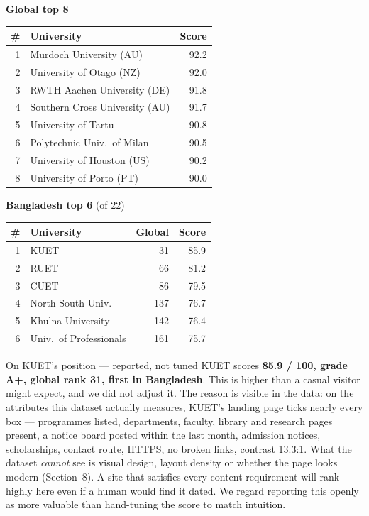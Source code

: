 \documentclass[11pt,a4paper]{article}
\begin{document}
\begin{table}[H]\centering\small
\begin{minipage}[t]{0.52\textwidth}\centering
\textbf{Global top 8}\\[3pt]
\begin{tabular}{rlr}
\toprule
\# & University & Score \\
\midrule
1 & Murdoch University (AU)       & 92.2 \\
2 & University of Otago (NZ)      & 92.0 \\
3 & RWTH Aachen University (DE)   & 91.8 \\
4 & Southern Cross University (AU)& 91.7 \\
5 & University of Tartu           & 90.8 \\
6 & Polytechnic Univ.\ of Milan   & 90.5 \\
7 & University of Houston (US)    & 90.2 \\
8 & University of Porto (PT)      & 90.0 \\
\bottomrule
\end{tabular}
\end{minipage}%
\begin{minipage}[t]{0.48\textwidth}\centering
\textbf{Bangladesh top 6} (of 22)\\[3pt]
\begin{tabular}{rlrr}
\toprule
\# & University & Global & Score \\
\midrule
1 & KUET  & 31  & 85.9 \\
2 & RUET  & 66  & 81.2 \\
3 & CUET  & 86  & 79.5 \\
4 & North South Univ. & 137 & 76.7 \\
5 & Khulna University & 142 & 76.4 \\
6 & Univ.\ of Professionals & 161 & 75.7 \\
\bottomrule
\end{tabular}
\end{minipage}
\end{table}

\begin{keybox}{On KUET's position --- reported, not tuned}
KUET scores \textbf{85.9 / 100, grade A+, global rank 31, first in Bangladesh}. This is higher
than a casual visitor might expect, and we did not adjust it. The reason is visible in the
data: on the attributes this dataset actually measures, KUET's landing page ticks nearly every
box --- programmes listed, departments, faculty, library and research pages present, a notice
board posted within the last month, admission notices, scholarships, contact route, HTTPS, no
broken links, contrast 13.3:1. What the dataset \emph{cannot} see is visual design, layout
density or whether the page looks modern (Section~8). A site that satisfies every content
requirement will rank highly here even if a human would find it dated. We regard reporting
this openly as more valuable than hand-tuning the score to match intuition.
\end{keybox}
\end{document}
